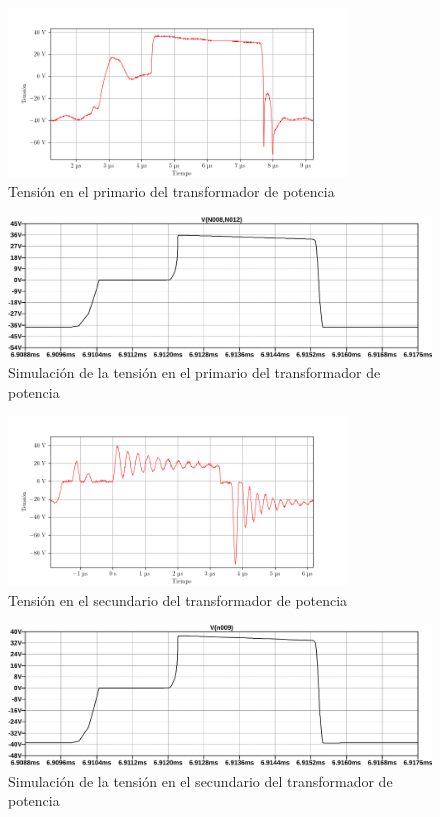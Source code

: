 \begin{figure}[H]
    \centering
    \includegraphics[width=0.8\textwidth]{images/capturas-osciloscopio/17-11-2022/55.png}
    \caption{Tensión en el primario del transformador de potencia}
    \label{fig:osc:38}
\end{figure}

\begin{figure}[H]
    \centering
    \includegraphics[width=\textwidth]{images/sim/19.pdf}
    \caption{Simulación de la tensión en el primario del transformador de potencia}
    \label{fig:sim:19}
\end{figure}

\begin{figure}[H]
    \centering
    \includegraphics[width=0.8\textwidth]{images/capturas-osciloscopio/17-11-2022/40.png}
    \caption{Tensión en el secundario del transformador de potencia}
    \label{fig:osc:40}
\end{figure}

\begin{figure}[H]
    \centering
    \includegraphics[width=\textwidth]{images/sim/20.pdf}
    \caption{Simulación de la tensión en el secundario del transformador de potencia}
    \label{fig:sim:20}
\end{figure}

